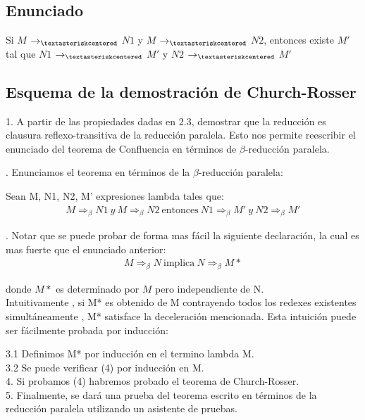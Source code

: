 \documentclass{article}
\begin{document}
\subsection{Enunciado}
Si $M$ $\rightarrow_{\textasteriskcentered}$ $N1$ y $M$ $\rightarrow_{\textasteriskcentered}$ $N2$, entonces existe $M'$ tal que $N1$ $\rightarrow_{\textasteriskcentered}$ $M'$ y $N2$ $\rightarrow_{\textasteriskcentered}$ $M'$


\subsection{Esquema de la demostración de Church-Rosser}
1. A partir de las propiedades dadas en 2.3, demostrar que la reducción es clausura reflexo-transitiva de la reducción paralela.
 Esto nos permite reescribir el enunciado del teorema de Confluencia en términos de $\beta$-reducción paralela.\hfill \break
 
. Enunciamos el teorema en términos de la $\beta$-reducción paralela:\hfill \break
 
Sean M, N1, N2, M’ expresiones lambda tales que:
\begin{align*}
M \Rightarrow_{\beta} N1\ y\ M \Rightarrow_{\beta} N2\ \text{entonces}
\ N1 \Rightarrow_{\beta} M'\ y\ N2 \Rightarrow_{\beta} M'
\end{align*}

. Notar que se puede probar de forma mas fácil  la siguiente declaración, la cual es mas fuerte que el enunciado anterior:
\begin{align}
 M \Rightarrow_{\beta} N\ \text{implica}\ N \Rightarrow_{\beta} M*
\end{align}

 donde $M*$ es determinado por $M$ pero independiente de N. \\
 
\noindent Intuitivamente , si M* es obtenido de M contrayendo todos los redexes existentes simultáneamente , M* satisface la deceleración mencionada.
Esta intuición puede ser fácilmente probada  por inducción:

3.1 Definimos M* por inducción en el termino lambda M. \\

3.2 Se puede verificar (4) por inducción en M. \\
 
4. Si probamos (4) habremos probado el teorema de Church-Rosser. \\

5. Finalmente, se dará una prueba del teorema escrito en términos de la reducción paralela utilizando un asistente de pruebas.\\
\end{document}
